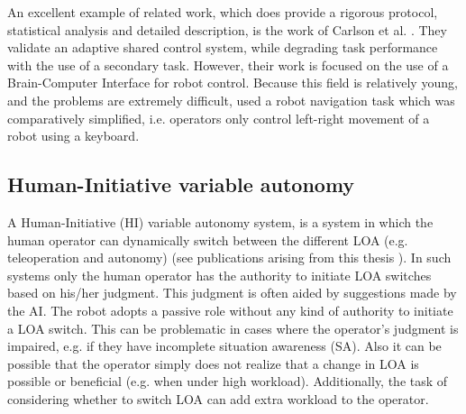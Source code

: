 \documentclass[a4paper,12pt,oneside,openright]{bhamthesis}
\begin{document}
An excellent example of related work, which does provide a rigorous protocol, statistical analysis and detailed description, is the work of Carlson et al. \citep{Carlson2012a}. They validate an adaptive shared control system, while degrading task performance with the use of a secondary task. However, their work is focused on the use of a Brain-Computer Interface for robot control. Because this field is relatively young, and the problems are extremely difficult, \citep{Carlson2012a} used a robot navigation task which was comparatively simplified, i.e. operators only control left-right movement of a robot using a keyboard. 

\subsection{Human-Initiative variable autonomy}
\label{section:HI-background}
A Human-Initiative (HI) variable autonomy system, is a system in which the human operator can dynamically switch between the different LOA (e.g. teleoperation and autonomy) (see publications arising from this thesis \citep{Chiou2016}). In such systems only the human operator has the authority to initiate LOA switches based on his/her judgment. This judgment is often aided by suggestions made by the AI. The robot adopts a passive role without any kind of authority to initiate a LOA switch. This can be problematic in cases where the operator's judgment is impaired, e.g. if they have incomplete situation awareness (SA). Also it can be possible that the operator simply does not realize that a change in LOA is possible or beneficial (e.g. when under high workload). Additionally, the task of considering whether to switch LOA can add extra workload to the operator. 
\end{document}
